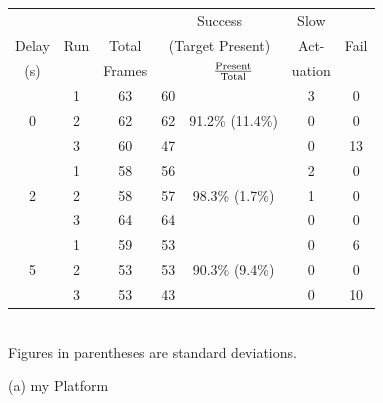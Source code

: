 \begin{table}
	\centering\small
	\begin{tabular}{|c|c|c|c|c|c|c|}
		\hline
		 &  &  & \multicolumn{2}{c|}{Success} & Slow & \\
		Delay & Run & Total  & \multicolumn{2}{c|}{\footnotesize (Target Present)} & Act- &  Fail\\
		\cline{5-5} 
		(s)&  &       Frames  &         & $\rm \frac{Present}{Total}$ & uation  & \\ 
		\hline
		& 1 & 63 & 60 & & 3 & 0 \\
		0 & 2 & 62 & 62 & 91.2\% \scriptsize{(11.4\%)}  & 0 & 0 \\
		& 3 & 60 & 47 & & 0 & 13\\
		\hline
		& 1 & 58 & 56 & & 2 & 0 \\
		2 & 2 & 58 & 57 & 98.3\% \scriptsize{(1.7\%)} & 1 & 0 \\
		& 3 & 64 & 64 & & 0 & 0 \\
		\hline
		& 1 & 59 & 53 & & 0 & 6 \\
		5 & 2 & 53 & 53 & 90.3\% \scriptsize{(9.4\%)} & 0 & 0  \\
		& 3 & 53 & 43 & & 0 & 10 \\
		\hline
	\end{tabular}
	\begin{captext}
		\centering \\[0.1cm] \small Figures in parentheses are standard deviations. \\
	\end{captext}
{(a) my Platform}\\[0.2in]

\vspace{0.2in}


\end{table}
